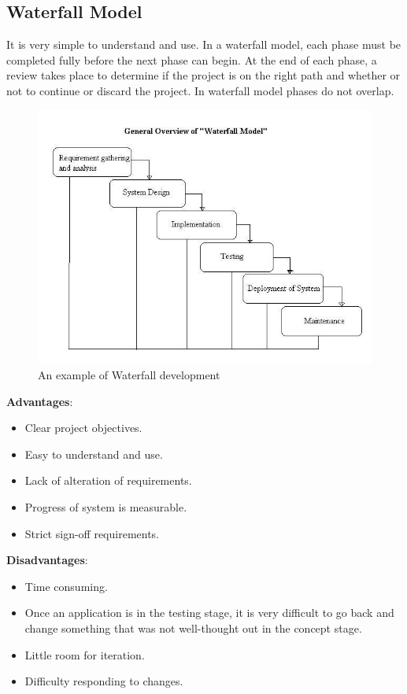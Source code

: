 \documentclass[a4paper, 12pt]{report}
\begin{document}
\subsection{Waterfall Model}
It is very simple to understand and use. In a waterfall model, each phase must be completed fully before the next phase can begin. At the end of each phase, a review takes place to determine if the project is on the right path and whether or not to continue or discard the project. In waterfall model phases do not overlap\cite{waterfall}.
\begin{figure}[H]
  \centering
    \includegraphics[width=1.0\textwidth]{Waterfall-model.jpg}
    \caption{An example of Waterfall development\cite{prototype}}
    \label{fig:waterfall-dev}
\end{figure}
\textbf{Advantages}:
\begin{itemize}
\item Clear project objectives.
\item Easy to understand and use.
\item Lack of alteration of requirements.
\item Progress of system is measurable.
\item Strict sign-off requirements. 
\end{itemize}
\textbf{Disadvantages}:
\begin{itemize}
\item Time consuming.
\item Once an application is in the testing stage, it is very difficult to go back and change something that was not well-thought out in the concept stage. 
\item Little room for iteration. 
\item Difficulty responding to changes.
\end{itemize}
\end{document}
